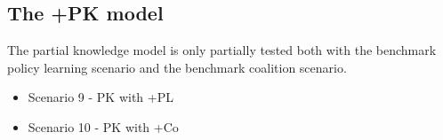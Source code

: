 \documentclass[12pt]{article}
\begin{document}
\subsection{The +PK model}

The partial knowledge model is only partially tested both with the benchmark policy learning scenario and the benchmark coalition scenario.

\begin{itemize}
\item Scenario 9 - PK with +PL
\item Scenario 10 - PK with +Co
\end{itemize}


\end{document}
